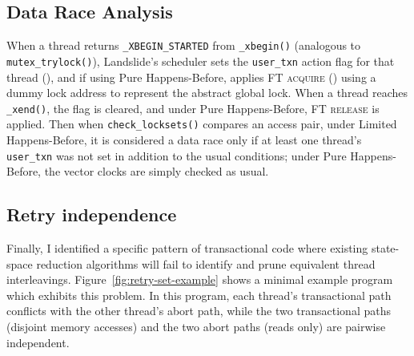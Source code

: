 \subsection{Data Race Analysis}
\label{sec:txn-datarace}

When a thread returns {\tt \_XBEGIN\_STARTED} from {\tt \_xbegin()}
(analogous to {\tt mutex\_trylock()}),
Landslide's scheduler sets the {\tt user\_txn} action flag for that thread (\sect{\ref{sec:landslide-scheduler}}),
and if using Pure Happens-Before,
applies \textsc{FT acquire} (\sect{\ref{sec:landslide-phb}}) using a dummy lock address to represent the abstract global lock.
When a thread reaches {\tt \_xend()},
the flag is cleared,
and under Pure Happens-Before,
\textsc{FT release} is applied.
Then when {\tt check\_locksets()} compares an access pair,
under Limited Happens-Before,
it is considered a data race only if at least one thread's {\tt user\_txn} was not set
in addition to the usual conditions; %
under Pure Happens-Before,
the vector clocks are simply checked as usual.

\subsection{Retry independence}
\label{sec:tm-retrysets}

Finally, I identified a specific pattern of transactional code where existing state-space reduction algorithms
will fail to identify and prune equivalent thread interleavings.
Figure~\ref{fig:retry-set-example} shows a minimal example program which exhibits this problem.
In this program, each thread's transactional path conflicts with the other thread's abort path,
while the two transactional paths (disjoint memory accesses) and the two abort paths (reads only) are pairwise independent.

